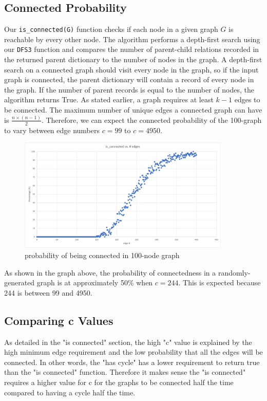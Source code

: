 \documentclass[12pt]{article}
\begin{document}
\subsection{Connected Probability}
Our \verb+is_connected(G)+ function checks if each node in a given graph $G$ is reachable by every other node. The algorithm performs a depth-first search using our \verb+DFS3+ function and compares the number of parent-child relations recorded in the returned parent dictionary to the number of nodes in the graph. A depth-first search on a connected graph should visit every node in the graph, so if the input graph is connected, the parent dictionary will contain a record of every node in the graph. If the number of parent records is equal to the number of nodes, the algorithm returns True. 
As stated earlier, a graph requires at least $k-1$ edges to be connected. The maximum number of unique edges a connected graph can have is $\frac{n\times(n-1)}{2}$. Therefore, we can expect the connected probability of the 100-graph to vary between edge numbers $c=99$ to $c=4950$.
\begin{figure}[H]
\centering
\includegraphics[width=0.9\textwidth,height=\textheight,keepaspectratio]{connected}
\caption{probability of being connected in 100-node graph}
\label{Figure: m2}
\end{figure}
As shown in the graph above, the probability of connectedness in a randomly-generated graph is at approximately 50\% when $c=244$. This is expected because 244 is between 99 and 4950. 
\subsection{Comparing c Values}
As detailed in the "is connected" section, the high "c" value is explained by the high minimum edge requirement and the low probability that all the edges will be connected. In other words, the "has cycle" has a lower requirement to return true than the "is connected" function. Therefore it makes sense the "is connected" requires a higher value for c for the graphs to be connected half the time compared to having a cycle half the time.
\end{document}
